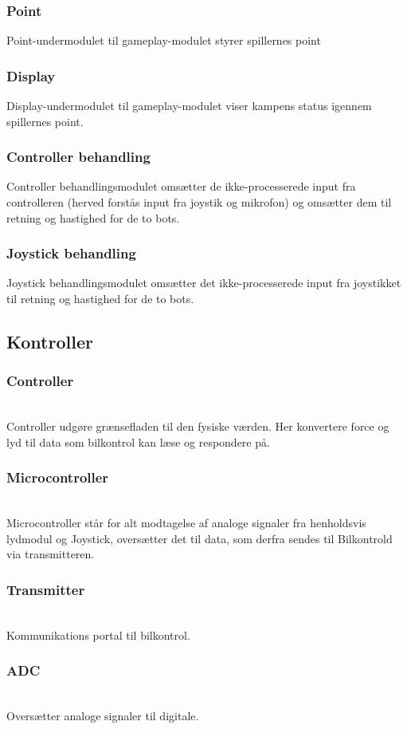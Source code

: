 \subsubsection*{\textbf{Point}}
Point-undermodulet til gameplay-modulet styrer spillernes point 
\subsubsection*{\textbf{Display}}
Display-undermodulet til gameplay-modulet viser kampens status igennem spillernes point. 
\subsubsection*{\textbf{Controller behandling}}
Controller behandlingsmodulet omsætter de ikke-processerede input fra controlleren (herved forstås input fra joystik og mikrofon) og omsætter dem til retning og hastighed for de to bots.  
\subsubsection*{\textbf{Joystick behandling}}
Joystick behandlingsmodulet omsætter det ikke-processerede input fra joystikket til retning og hastighed for de to bots. 

\subsection{Kontroller}
\subsubsection*{\textbf{Controller}}\hfill\\
Controller udgøre grænsefladen til den fysiske værden. Her konvertere force og lyd til data som bilkontrol kan læse og respondere på.
\subsubsection*{\textbf{Microcontroller}}\hfill\\
Microcontroller står for alt modtagelse af analoge signaler fra henholdsvis lydmodul og Joystick, oversætter det til data, som derfra sendes til Bilkontrold via transmitteren.
\subsubsection*{\textbf{Transmitter}}\hfill\\
Kommunikations portal til bilkontrol.
\subsubsection*{\textbf{ADC}}\hfill\\
Oversætter analoge signaler til digitale.
